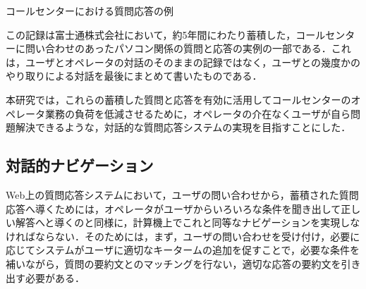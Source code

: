 \begin{example}
 \begin{center}
 \end{center}
 \caption{コールセンターにおける質問応答の例}
 \label{ex:call}
\end{example}

この記録は富士通株式会社において，約5年間にわたり蓄積した，コールセンターに問い合わせのあったパソコン関係の質問と応答の実例の一部である．これは，ユーザとオペレータの対話のそのままの記録ではなく，ユーザとの幾度かのやり取りによる対話を最後にまとめて書いたものである．

本研究では，これらの蓄積した質問と応答を有効に活用してコールセンターのオペレータ業務の負荷を低減させるために，オペレータの介在なくユーザが自ら問題解決できるような，対話的な質問応答システムの実現を目指すことにした．

\subsection{対話的ナビゲーション}
Web上の質問応答システムにおいて，ユーザの問い合わせから，蓄積された質問応答へ導くためには，オペレータがユーザからいろいろな条件を聞き出して正しい解答へと導くのと同様に，計算機上でこれと同等なナビゲーションを実現しなければならない．そのためには，まず，ユーザの問い合わせを受け付け，必要に応じてシステムがユーザに適切なキータームの追加を促すことで，必要な条件を補いながら，質問の要約文とのマッチングを行ない，適切な応答の要約文を引き出す必要がある．

